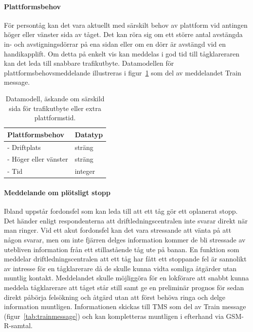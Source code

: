 \paragraph{Plattformsbehov}
För persontåg kan det vara aktuellt med särskilt behov av plattform vid antingen höger eller vänster sida av tåget.
Det kan röra sig om ett större antal avstängda in- och avstigningsdörrar på ena sidan eller om en dörr är avstängd vid en handikapplift.
Om detta på enkelt vis kan meddelas i god tid till tågklareraren kan det leda till snabbare trafikutbyte.
Datamodellen för plattformsbehovsmeddelande illustreras i figur~\ref{tab:plattformsbehov} som del av meddelandet Train message.
\begin{table}[hbt!]
    \centering
    \begin{tabular}{|l|l|}
        \hline
        \color{blue}
        \textbf{Plattformsbehov} & Datatyp \\
        \hline
        - Driftplats & sträng \\
        - Höger eller vänster & sträng \\
        - Tid & integer \\
        \hline
    \end{tabular}
    \caption{Datamodell, äskande om särskild sida för trafikutbyte eller extra plattformstid.}
    \label{tab:plattformsbehov}
\end{table}
\paragraph{Meddelande om plötsligt stopp}
Ibland uppstår fordonsfel som kan leda till att ett tåg gör ett oplanerat stopp.
Det händer enligt respondenterna att driftledningscentralen inte svarar direkt när man ringer.
Vid ett akut fordonsfel kan det vara stressande att vänta på att någon svarar, men om inte fjärren delges information kommer de bli stressade av utebliven information från ett stillastående tåg ute på banan.
En funktion som meddelar driftledningscentralen att ett tåg har fått ett stoppande fel är sannolikt av intresse för en tågklarerare då de skulle kunna vidta somliga åtgärder utan muntlig kontakt.
Meddelandet skulle möjliggöra för en lokförare att snabbt kunna meddela tågklarerare att tåget står still samt ge en preliminär prognos för sedan direkt påbörja felsökning och åtgärd utan att först behöva ringa och delge information muntligen.
Informationen skickas till TMS som del av Train message (figur~\ref{tab:trainmessage}) och kan kompletteras muntligen i efterhand via GSM-R-samtal.
